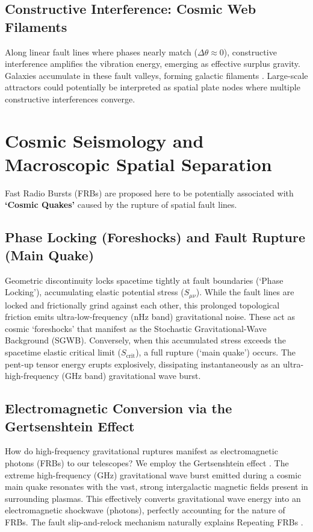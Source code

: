 \documentclass[reprint,amsmath,amssymb,aps,prd]{revtex4-2}
\begin{document}
\subsection{Constructive Interference: Cosmic Web Filaments}
Along linear fault lines where phases nearly match ($\Delta\theta \approx 0$), constructive interference amplifies the vibration energy, emerging as effective surplus gravity. Galaxies accumulate in these fault valleys, forming galactic filaments \cite{Bond1996}. Large-scale attractors could potentially be interpreted as spatial plate nodes where multiple constructive interferences converge.

\section{Cosmic Seismology and Macroscopic Spatial Separation}
Fast Radio Bursts (FRBs) \cite{Lorimer2007} are proposed here to be potentially associated with \textbf{`Cosmic Quakes'} caused by the rupture of spatial fault lines.

\subsection{Phase Locking (Foreshocks) and Fault Rupture (Main Quake)}
Geometric discontinuity locks spacetime tightly at fault boundaries (`Phase Locking'), accumulating elastic potential stress ($S_{\mu\nu}$).
While the fault lines are locked and frictionally grind against each other, this prolonged topological friction emits ultra-low-frequency (nHz band) gravitational noise.
These act as cosmic `foreshocks' that manifest as the Stochastic Gravitational-Wave Background (SGWB).
Conversely, when this accumulated stress exceeds the spacetime elastic critical limit ($S_{\mathrm{crit}}$), a full rupture (`main quake') occurs.
The pent-up tensor energy erupts explosively, dissipating instantaneously as an ultra-high-frequency (GHz band) gravitational wave burst.

\subsection{Electromagnetic Conversion via the Gertsenshtein Effect}
How do high-frequency gravitational ruptures manifest as electromagnetic photons (FRBs) to our telescopes?
We employ the Gertsenshtein effect \cite{Gertsenshtein1961}. The extreme high-frequency (GHz) gravitational wave burst emitted during a cosmic main quake resonates with the vast, strong intergalactic magnetic fields present in surrounding plasmas.
This effectively converts gravitational wave energy into an electromagnetic shockwave (photons), perfectly accounting for the nature of FRBs.
The fault slip-and-relock mechanism naturally explains Repeating FRBs \cite{CHIME2020}.
\end{document}
